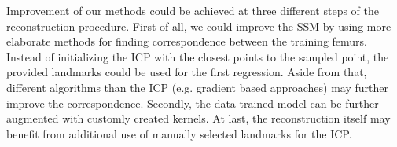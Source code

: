 \documentclass{article}
\begin{document}
	Improvement of our methods could be achieved at three different steps of the reconstruction procedure. First of all, we could improve the SSM by using more elaborate methods for finding correspondence between the training femurs. Instead of initializing the ICP with the closest points to the sampled point, the provided landmarks could be used for the first regression. Aside from that, different algorithms than the ICP (e.g. gradient based approaches) may further improve the correspondence. Secondly, the data trained model can be further augmented with customly created kernels. At last, the reconstruction itself may benefit from additional use of manually selected landmarks for the ICP. 
	
\end{document}
